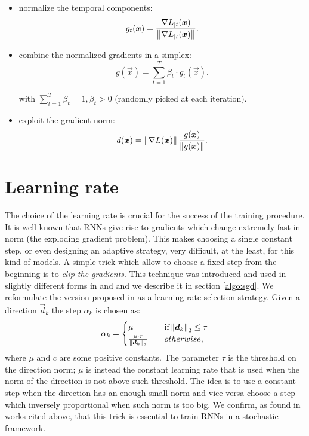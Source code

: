 \begin{itemize}
	\item normalize the temporal components:
	\begin{equation}
	g_t(\boldsymbol{x}) = \frac{\nabla L_{|t}(\boldsymbol{x})}{\left\Vert \nabla L_{|t}(\boldsymbol{x}) \right\Vert}.
	\end{equation}
	
	\item combine the normalized gradients in a simplex:
	\begin{equation}
	g(\vec{x}) = \sum_{t=1}^T \beta_t \cdot g_t(\vec{x}).
	\end{equation}
	
	with $\sum_{t=1}^T\beta_t=1, \beta_t>0$ (randomly picked at each iteration).
	\item exploit the gradient norm:
	\begin{equation}
	d(\boldsymbol{x}) = \left\Vert \nabla L (\boldsymbol{x}) \right\Vert\frac{g(\boldsymbol{x})}{\left\Vert g(\boldsymbol{x}) \right\Vert}.
	\end{equation}
\end{itemize}
\section{Learning rate}

The choice of the learning rate is crucial for the success of the training procedure. It is well known that RNNs give rise to gradients which change extremely fast in norm (the exploding gradient problem). This makes choosing a single constant step, or even designing an adaptive strategy, very difficult, at the least, for this kind of models. A simple trick which allow to choose a fixed step from the beginning is to \textit{clip the gradients}. This technique was introduced and used in slightly different forms in \cite{understandingExplodingGradients} and \cite{clippingMikolov} and we describe it in section \ref{algo:sgd}. We reformulate the version proposed in \cite{understandingExplodingGradients} as a learning rate selection strategy.
Given a direction $\vec{d}_k$ the step $\alpha_k$ is chosen as:
\begin{equation}
\alpha_k = 
\begin{cases}
	\mu  \quad &\mbox{if} \left\Vert \boldsymbol{d}_k \right\Vert_2 \leq \tau\\
	\frac{\mu \cdot \tau}{\left\Vert \boldsymbol{d}_k \right\Vert_2} \quad & otherwise,
\end{cases}
\end{equation}
where $\mu$ and $c$ are some positive constants. The parameter $\tau$ is the threshold on the direction norm; $\mu$ is instead the constant learning rate that is used when the norm of the direction is not above such threshold. The idea is to use a constant step when the direction has an enough small norm and vice-versa choose a step which inversely proportional when such norm is too big. We confirm, as found in works cited above, that this trick is essential to train RNNs in a stochastic framework.

